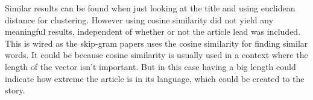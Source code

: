 Similar results can be found when just looking at the title and using euclidean distance for clustering. However using cosine similarity did not yield any meaningful results, independent of whether or not the article lead was included. This is wired as the skip-gram papers \cite{word2vec-comparing, word2vec-details} uses the cosine similarity for finding similar words. It could be because cosine similarity is usually used in a context where the length of the vector isn't important. But in this case having a big length could indicate how extreme the article is in its language, which could be created to the story. 
